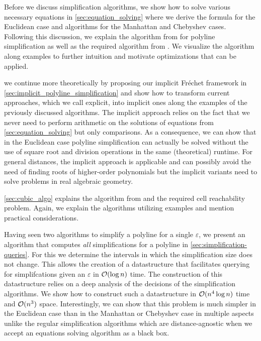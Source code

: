 Before we discuss simplification algorithms, we show how to solve various necessary equations in \cref{sec:equation_solving} where we derive the formula for the Euclidean case and algorithms for the Manhattan and Chebyshev cases. Following this discussion, we explain the algorithm from \citeauthor{on_optimal_polyline_simplification_using_the_hausdorff_and_frechet_distance} for polyline simplification as well as the required algorithm from \citeauthor{computing_the_frechet_distance_between_two_polygonal_curves}. We visualize the algorithm along examples to further intuition and motivate optimizations that can be applied. 

we continue more theoretically by proposing our implicit Fréchet framework in \cref{sec:implicit_polyline_simplification} and show how to transform current approaches, which we call explicit, into implicit ones along the examples of the prviously discussed algorithms. The implicit approach relies on the fact that we never need to perform arithmetic on the solutions of equations from \cref{sec:equation_solving} but only comparisons. As a consequence, we can show that in the Euclidean case polyline simplification can actually be solved without the use of square root and division operations in the same (theoretical) runtime. For general distances, the implicit approach is applicable and can possibly avoid the need of finding roots of higher-order polynomials but the implicit variants need to solve problems in real algebraic geometry. 

\cref{sec:cubic_algo} explains the algorithm from \citeauthor{polyline_simplification_has_cubic_complexity_bringmannetal} and the required cell reachability problem. Again, we explain the algorithms utilizing examples and mention practical considerations.

Having seen two algorithms to simplify a polyline for a single \(\varepsilon\), we present an algorithm that computes \emph{all} simplifications for a polyline in \cref{sec:simplification-queries}. For this we determine the intervals in which the simplification size does not change. This allows the creation of a datastructure that facilitates querying for simplifcations given an \(\varepsilon\) in \(\mathcal{O}(\log n)\) time. The construction of this datastructure relies on a deep analysis of the decisions of the simplification algorithms. We show how to construct such a datastructure in \(\mathcal{O}(n^4 \log n)\) time and \(\mathcal{O}(n^3)\) space. Interestingly, we can show that this problem is much simpler in the Euclidean case than in the Manhattan or Chebyshev case in multiple aspects unlike the regular simplification algorithms which are distance-agnostic when we accept an equations solving algorithm as a black box.

